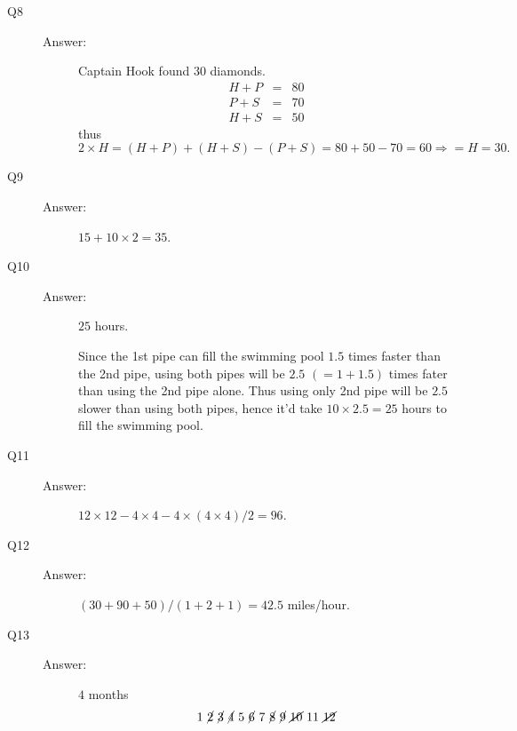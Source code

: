 \documentclass{article}
\begin{document}
\begin{description}
\item[Q8]
\begin{description}
\item[Answer:] Captain Hook found $30$ diamonds.
\begin{eqnarray*}
H + P &=& 80
\\
P + S &=& 70
\\
H + S &=& 50
\end{eqnarray*}
thus
\[
2 \times H = (H+P) + (H+S) - (P+S) = 80+50-70 = 60
\Rightarrow = H = 30.
\]
\end{description}


\item[Q9]
\begin{description}
\item[Answer:] $15 + 10 \times 2 = 35$.
\end{description}


\item[Q10]
\begin{description}
\item[Answer:] $25$ hours.

Since the 1st pipe can fill the swimming pool $1.5$ times faster than the 2nd pipe,
using both pipes will be $2.5$ $(=1 + 1.5)$ times fater than using the 2nd pipe alone.
Thus using only 2nd pipe will be $2.5$ slower than using both pipes, hence it'd take $10 \times 2.5 = 25$ hours to fill the swimming pool.
\end{description}


\item[Q11]
\begin{description}
\item[Answer:] $12 \times 12 - 4 \times 4 - 4 \times (4\times 4)/2 = 96$.
\end{description}


\item[Q12]
\begin{description}
\item[Answer:] $(30+90+50)/(1+2+1) = 42.5$ miles/hour.
\end{description}


\item[Q13]
\begin{description}
\item[Answer:] $4$ months
\[
1\ \cancel{2}\ \cancel{3}\ \cancel{4}\ 5\ \cancel{6}\ 7\ \cancel{8}\ \cancel{9}\ \cancel{10}\ 11\ \cancel{12}
\]
\end{description}


\end{description}
\end{document}
